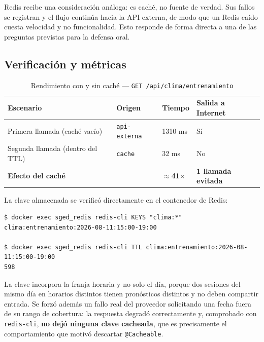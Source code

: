 \documentclass[12pt,a4paper]{article}
\begin{document}
Redis recibe una consideración análoga: es caché, no fuente de verdad. Sus fallos se registran y
el flujo continúa hacia la API externa, de modo que un Redis caído cuesta velocidad y no
funcionalidad. Esto responde de forma directa a una de las preguntas previstas para la defensa
oral.

\subsection{Verificación y métricas}

\begin{table}[h!]
  \centering
  \caption{Rendimiento con y sin caché --- \texttt{GET /api/clima/entrenamiento}}
  \label{tab:cache-metricas}
  \begin{tabularx}{\linewidth}{@{}L{4.6cm}L{3.2cm}L{2.8cm}L{3.2cm}@{}}
    \toprule
    \textbf{Escenario} & \textbf{Origen} & \textbf{Tiempo} & \textbf{Salida a Internet} \\
    \midrule
    Primera llamada (caché vacío) & \texttt{api-externa} & 1310 ms & Sí \\
    Segunda llamada (dentro del TTL) & \texttt{cache} & 32 ms & No \\
    \midrule
    \textbf{Efecto del caché} & & \textbf{$\approx$41$\times$} & \textbf{1 llamada evitada} \\
    \bottomrule
  \end{tabularx}
\end{table}

La clave almacenada se verificó directamente en el contenedor de Redis:

\begin{lstlisting}[style=bash, caption={Verificación del caché en Redis}]
$ docker exec sged_redis redis-cli KEYS "clima:*"
clima:entrenamiento:2026-08-11:15:00-19:00

$ docker exec sged_redis redis-cli TTL clima:entrenamiento:2026-08-11:15:00-19:00
598
\end{lstlisting}

La clave incorpora la franja horaria y no solo el día, porque dos sesiones del mismo día en
horarios distintos tienen pronósticos distintos y no deben compartir entrada. Se forzó además un
fallo real del proveedor solicitando una fecha fuera de su rango de cobertura: la respuesta
degradó correctamente y, comprobado con \texttt{redis-cli}, \textbf{no dejó ninguna clave
cacheada}, que es precisamente el comportamiento que motivó descartar \texttt{@Cacheable}.
\end{document}
